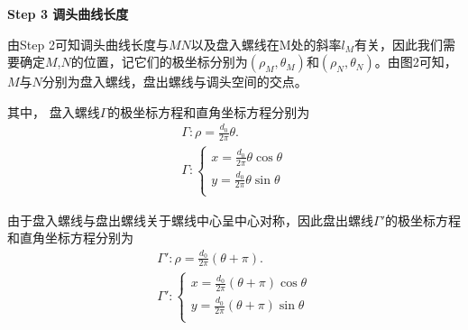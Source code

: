 \documentclass{cumcmthesis}
\begin{document}
\noindent\textbf{Step 3 调头曲线长度} 
\par 由Step 2可知调头曲线长度与$MN$以及盘入螺线在M处的斜率$l_M$有关，因此我们需要确定$M$,$N$的位置，记它们的极坐标分别为$(\rho_M,\theta_M)$和$(\rho_N,\theta_N)$。由图2可知，$M$与$N$分别为盘入螺线，盘出螺线与调头空间的交点。
\par 其中， 盘入螺线\(\varGamma\)的极坐标方程和直角坐标方程分别为
\begin{gather}
    \varGamma :\rho =\frac{d_0}{2\pi}\theta.\label{7.3.1}
    \\
    \varGamma :\begin{cases}\label{7.4.1}
        x=\frac{d_0}{2\pi}\theta \cos \theta\\
        y=\frac{d_0}{2\pi}\theta \sin \theta\\
        \end{cases}
    \end{gather}
   
    \par 由于盘入螺线与盘出螺线关于螺线中心呈中心对称，因此盘出螺线$\varGamma'$的极坐标方程和直角坐标方程分别为
    \begin{gather}
        \varGamma':\rho =\frac{d_0}{2\pi}\left( \theta +\pi \right) .\label{7.3.2}  \\
        \varGamma':\begin{cases}\label{7.4.2}
            x=\frac{d_0}{2\pi}\left( \theta +\pi \right) \cos \theta\\
            y=\frac{d_0}{2\pi}\left( \theta +\pi \right) \sin \theta\\
            \end{cases}
        \end{gather}
    
\end{document}
